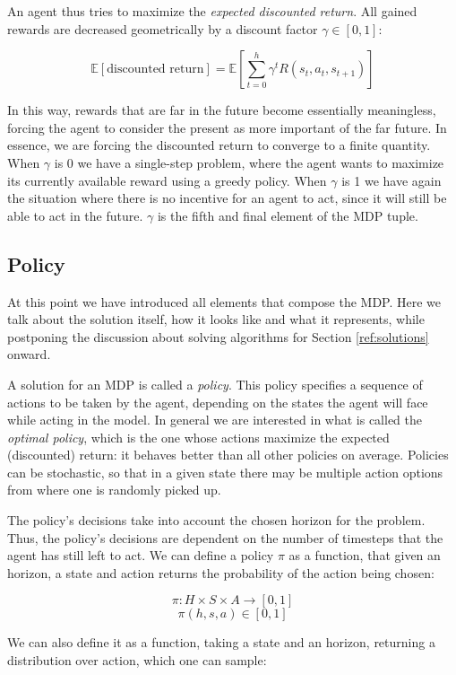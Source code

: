 An agent thus tries to maximize the \textit{expected discounted return}. All gained rewards are
decreased geometrically by a discount factor $\gamma \in [0,1]$:

\[ \mathbb{E}[\text{discounted return}] = \mathbb{E} \left [ \sum_{t=0}^h \gamma^t R(s_t,
a_t, s_{t+1}) \right ] \]

In this way, rewards that are far in the future become essentially meaningless, forcing the agent to
consider the present as more important of the far future. In essence, we are forcing the discounted
return to converge to a finite quantity. When $\gamma$ is 0 we have a single-step problem, where the
agent wants to maximize its currently available reward using a greedy policy.  When $\gamma$ is 1 we
have again the situation where there is no incentive for an agent to act, since it will still be
able to act in the future. $\gamma$ is the fifth and final element of the MDP tuple.

\subsection{Policy}

At this point we have introduced all elements that compose the MDP. Here we talk about the solution
itself, how it looks like and what it represents, while postponing the discussion about solving
algorithms for Section \ref{ref:solutions} onward.

A solution for an MDP is called a \textit{policy}. This policy specifies a sequence of actions to
be taken by the agent, depending on the states the agent will face while acting in the model. In
general we are interested in what is called the \textit{optimal policy}, which is the one whose
actions maximize the expected (discounted) return: it behaves better than all other policies on
average. Policies can be stochastic, so that in a given state there may be multiple action options
from where one is randomly picked up.

The policy's decisions take into account the chosen horizon for the problem. Thus, the policy's
decisions are dependent on the number of timesteps that the agent has still left to act. We can
define a policy $\pi$ as a function, that given an horizon, a state and action returns the
probability of the action being chosen:

\[ \pi : H \times S \times A \rightarrow [0,1] \]
\[ \pi(h, s, a) \in [0,1] \]

We can also define it as a function, taking a state and an horizon, returning a distribution over
action, which one can sample:


